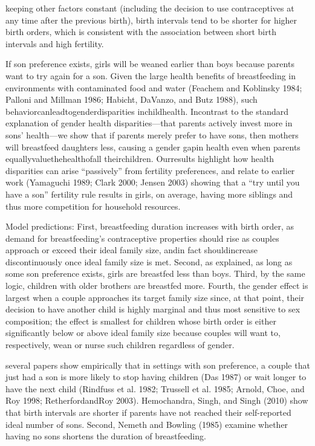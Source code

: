 keeping other factors constant (including the decision to use
contraceptives at any time after the previous birth), birth intervals
tend to be shorter for higher birth orders, which is consistent with the
association between short birth intervals and high fertility.

\citep{Jayachandran2011}

If son preference exists, girls will be weaned earlier than boys because
parents want to try again for a son. Given the large health benefits of
breastfeeding in environments with contaminated food and water (Feachem
and Koblinsky 1984; Palloni and Millman 1986; Habicht, DaVanzo, and Butz
1988), such behaviorcanleadtogenderdisparities inchildhealth. Incontrast
to the standard explanation of gender health disparities—that parents
actively invest more in sons’ health—we show that if parents merely
prefer to have sons, then mothers will breastfeed daughters less,
causing a gender gapin health even when parents
equallyvaluethehealthofall theirchildren. Ourresults highlight how
health disparities can arise “passively” from fertility preferences, and
relate to earlier work (Yamaguchi 1989; Clark 2000; Jensen 2003) showing
that a “try until you have a son” fertility rule results in girls, on
average, having more siblings and thus more competition for household
resources.

Model predictions:
First, breastfeeding duration increases with birth order, as demand for
breastfeeding’s contraceptive properties should rise as couples approach
or exceed their ideal family size, andin fact shouldincrease
discontinuously once ideal family size is met.
Second, as explained, as long as some son preference exists, girls are
breastfed less than boys.
Third, by the same logic, children with older brothers are breastfed
more.
Fourth, the gender effect is largest when a couple approaches its target
family size since, at that point, their decision to have another child
is highly marginal and thus most sensitive to sex composition; the
effect is smallest for children whose birth order is either
significantly below or above ideal family size because couples will want
to, respectively, wean or nurse such children regardless of gender.

several papers show empirically that in settings with son preference, a
couple that just had a son is more likely to stop having children (Das
1987) or wait longer to have the next child (Rindfuss et al. 1982;
Trussell et al. 1985; Arnold, Choe, and Roy 1998; RetherfordandRoy
2003). Hemochandra, Singh, and Singh (2010) show that birth intervals
are shorter if parents have not reached their self-reported ideal number
of sons. Second, Nemeth and Bowling (1985) examine whether having no
sons
shortens the duration of breastfeeding.

